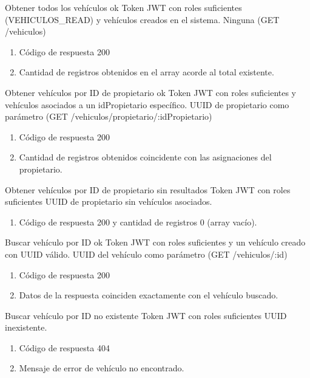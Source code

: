 {Obtener todos los vehículos ok}
{Token JWT con roles suficientes (VEHICULOS\_READ) y vehículos creados en el sistema.}
{Ninguna (GET /vehiculos)}
{\begin{enumerate} [leftmargin=*, nosep]
    \item Código de respuesta 200
    \item Cantidad de registros obtenidos en el array acorde al total existente.
\end{enumerate}}

{Obtener vehículos por ID de propietario ok}
{Token JWT con roles suficientes y vehículos asociados a un idPropietario específico.}
{UUID de propietario como parámetro (GET /vehiculos/propietario/:idPropietario)}
{\begin{enumerate} [leftmargin=*, nosep]
    \item Código de respuesta 200
    \item Cantidad de registros obtenidos coincidente con las asignaciones del propietario.
\end{enumerate}}

{Obtener vehículos por ID de propietario sin resultados}
{Token JWT con roles suficientes}
{UUID de propietario sin vehículos asociados.}
{\begin{enumerate} [leftmargin=*, nosep]
    \item Código de respuesta 200 y cantidad de registros 0 (array vacío).
\end{enumerate}}

{Buscar vehículo por ID ok}
{Token JWT con roles suficientes y un vehículo creado con UUID válido.}
{UUID del vehículo como parámetro (GET /vehiculos/:id)}
{\begin{enumerate} [leftmargin=*, nosep]
    \item Código de respuesta 200
    \item Datos de la respuesta coinciden exactamente con el vehículo buscado.
\end{enumerate}}

{Buscar vehículo por ID no existente}
{Token JWT con roles suficientes}
{UUID inexistente.}
{\begin{enumerate} [leftmargin=*, nosep]
    \item Código de respuesta 404
    \item Mensaje de error de vehículo no encontrado.
\end{enumerate}}

